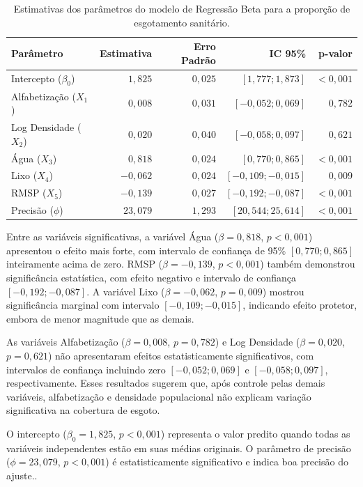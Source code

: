 \documentclass[12pt, a4paper]{article}
\begin{document}
\begin{table}[H]
\centering
\caption{Estimativas dos parâmetros do modelo de Regressão Beta para a proporção de esgotamento sanitário.}
\label{tab:coeficientes}
\begin{tabular}{lrrrr}
\toprule
\textbf{Parâmetro} & \textbf{Estimativa} & \textbf{Erro Padrão} & \textbf{IC 95\%} & \textbf{p-valor} \\
\midrule
Intercepto ($\beta_0$) & $1,825$  & $0,025$ & $[1,777; 1,873]$   & $<0,001$ \\
Alfabetização ($X_1$)  & $0,008$  & $0,031$ & $[-0,052; 0,069]$  & $0,782$ \\
Log Densidade ($X_2$)  & $0,020$  & $0,040$ & $[-0,058; 0,097]$  & $0,621$ \\
Água ($X_3$)           & $0,818$  & $0,024$ & $[0,770; 0,865]$   & $<0,001$ \\
Lixo ($X_4$)           & $-0,062$ & $0,024$ & $[-0,109; -0,015]$ & $0,009$ \\
RMSP ($X_5$)           & $-0,139$ & $0,027$ & $[-0,192; -0,087]$ & $<0,001$ \\
\midrule
Precisão ($\phi$)      & $23,079$ & $1,293$ & $[20,544; 25,614]$ & $<0,001$ \\
\bottomrule
\end{tabular}
\end{table}

Entre as variáveis significativas, a variável Água ($\beta = 0,818$, $p < 0,001$) apresentou o efeito mais forte, com intervalo de confiança de 95\% $[0,770; 0,865]$ inteiramente acima de zero. RMSP ($\beta = -0,139$, $p < 0,001$) também demonstrou significância estatística, com efeito negativo e intervalo de confiança $[-0,192; -0,087]$. A variável Lixo ($\beta = -0,062$, $p = 0,009$) mostrou significância marginal com intervalo $[-0,109; -0,015]$, indicando efeito protetor, embora de menor magnitude que as demais.

As variáveis Alfabetização ($\beta = 0,008$, $p = 0,782$) e Log Densidade ($\beta = 0,020$, $p = 0,621$) não apresentaram efeitos estatisticamente significativos, com intervalos de confiança incluindo zero $[−0,052; 0,069]$ e $[−0,058; 0,097]$, respectivamente. Esses resultados sugerem que, após controle pelas demais variáveis, alfabetização e densidade populacional não explicam variação significativa na cobertura de esgoto.

O intercepto ($\beta_0 = 1,825$, $p < 0,001$) representa o valor predito quando todas as variáveis independentes estão em suas médias originais. O parâmetro de precisão ($\phi = 23,079$, $p < 0,001$) é estatisticamente significativo e indica boa precisão do ajuste..
\end{document}
